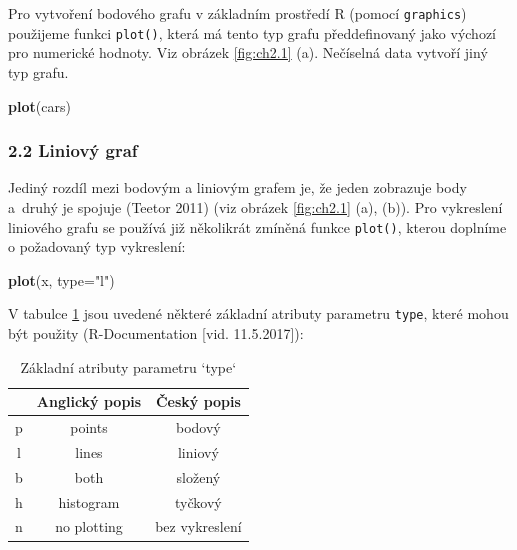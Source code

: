 \documentclass[12pt,]{article}
\newenvironment{Shaded}{\begin{snugshade}}{\end{snugshade}}
\newcommand{\KeywordTok}[1]{\textcolor[rgb]{0.13,0.29,0.53}{\textbf{#1}}}
\newcommand{\DataTypeTok}[1]{\textcolor[rgb]{0.13,0.29,0.53}{#1}}
\newcommand{\StringTok}[1]{\textcolor[rgb]{0.31,0.60,0.02}{#1}}
\newcommand{\NormalTok}[1]{#1}
\begin{document}
\qquad Pro vytvoření bodového grafu v základním prostředí R (pomocí
\texttt{graphics}) použijeme funkci \texttt{plot()}, která má tento typ
grafu předdefinovaný jako výchozí pro numerické hodnoty. Viz obrázek
\ref{fig:ch2.1} (a). Nečíselná data vytvoří jiný typ grafu.

\begin{Shaded}
\begin{Highlighting}[]
\KeywordTok{plot}\NormalTok{(cars)}
\end{Highlighting}
\end{Shaded}

\subsubsection{2.2 Liniový graf}\label{liniovy-graf}

\qquad Jediný rozdíl mezi bodovým a liniovým grafem je, že jeden
zobrazuje body a~druhý je spojuje (Teetor 2011) (viz obrázek
\ref{fig:ch2.1} (a), (b)). Pro vykreslení liniového grafu se používá již
několikrát zmíněná funkce \texttt{plot()}, kterou doplníme o požadovaný
typ vykreslení:

\begin{Shaded}
\begin{Highlighting}[]
\KeywordTok{plot}\NormalTok{(x, }\DataTypeTok{type=}\StringTok{"l"}\NormalTok{)}
\end{Highlighting}
\end{Shaded}

V tabulce \ref{tab1} jsou uvedené některé základní atributy parametru
\texttt{type}, které mohou být použity (R-Documentation {[}vid.
11.5.2017{]}):

\begin{table}[H]
\centering
\begin{tabular}{|c|c|c|}
\hline
  & Anglický popis & Český popis    \\ \hline
p & points         & bodový         \\ \hline
l & lines          & liniový        \\ \hline
b & both           & složený        \\ \hline
h & histogram      & tyčkový        \\ \hline
n & no plotting    & bez vykreslení \\ \hline
\end{tabular}
\caption{Základní atributy parametru `type`}
\label{tab1}
\end{table}
\end{document}
